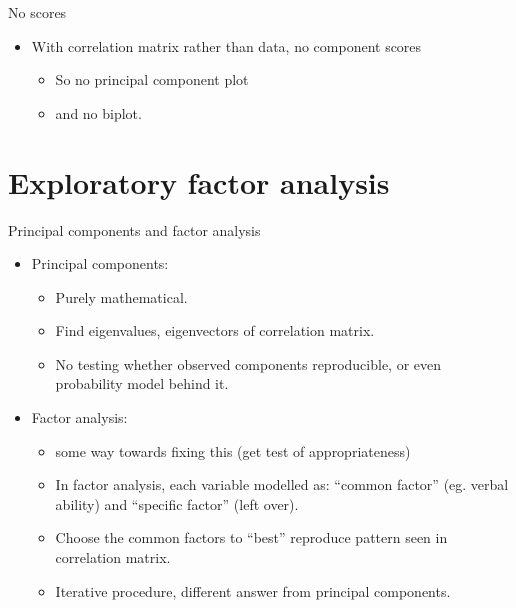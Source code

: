 \documentclass[ignorenonframetext,]{beamer}
\begin{document}
\begin{frame}{No scores}
\protect\hypertarget{no-scores}{}

\begin{itemize}
\item
  With correlation matrix rather than data, no component scores

  \begin{itemize}
  \item
    So no principal component plot
  \item
    and no biplot.
  \end{itemize}
\end{itemize}

\end{frame}

\hypertarget{exploratory-factor-analysis}{%
\section{Exploratory factor
analysis}\label{exploratory-factor-analysis}}

\begin{frame}{Principal components and factor analysis}
\protect\hypertarget{principal-components-and-factor-analysis}{}

\begin{itemize}
\item
  Principal components:

  \begin{itemize}
  \item
    Purely mathematical.
  \item
    Find eigenvalues, eigenvectors of correlation matrix.
  \item
    No testing whether observed components reproducible, or even
    probability model behind it.
  \end{itemize}
\item
  Factor analysis:

  \begin{itemize}
  \item
    some way towards fixing this (get test of appropriateness)
  \item
    In factor analysis, each variable modelled as: ``common factor''
    (eg. verbal ability) and ``specific factor'' (left over).
  \item
    Choose the common factors to ``best'' reproduce pattern seen in
    correlation matrix.
  \item
    Iterative procedure, different answer from principal components.
  \end{itemize}
\end{itemize}

\end{frame}
\end{document}
